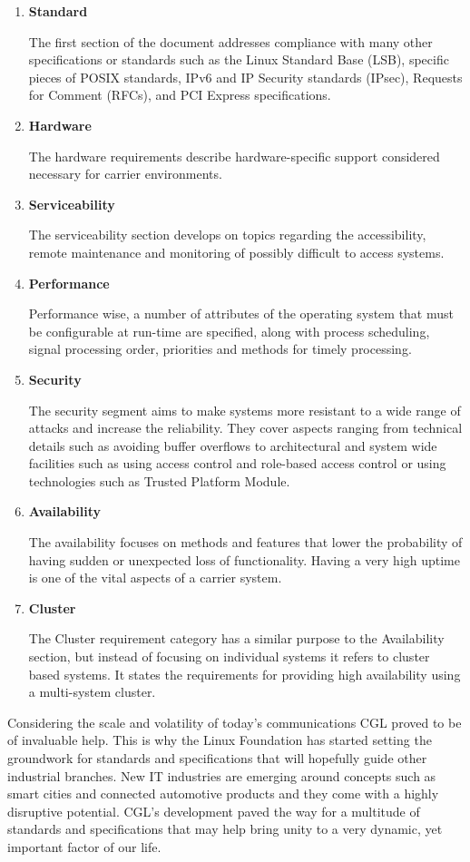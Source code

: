 \begin{enumerate}
\item \textbf{Standard}

The first section of the document addresses compliance with many other specifications or standards such as the Linux Standard Base (LSB), specific pieces of POSIX standards, IPv6 and IP Security standards (IPsec), Requests for Comment (RFCs), and PCI Express specifications.
\item \textbf{Hardware}

The hardware requirements describe hardware-specific support considered necessary for carrier environments.
\item \textbf{Serviceability}

The serviceability section develops on topics regarding the accessibility, remote maintenance and monitoring of possibly difficult to access systems. 
\item \textbf{Performance}

Performance wise, a number of attributes of the operating system that must be configurable at run-time are specified, along with process scheduling, signal processing order, priorities and methods for timely processing.
\item \textbf{Security}

The security segment aims to make systems more resistant to a wide range of attacks and increase the reliability. They cover aspects ranging from technical details such as avoiding buffer overflows to architectural and system wide facilities such as using access control and role-based access control or using technologies such as Trusted Platform Module.
\item \textbf{Availability}

The availability focuses on methods and features that lower the probability of having sudden or unexpected loss of functionality. Having a very high uptime is one of the vital aspects of a carrier system.
\item \textbf{Cluster}

The Cluster requirement category has a similar purpose to the Availability section, but instead of focusing on individual systems it refers to cluster based systems. It states the requirements for providing high availability using a multi-system cluster.

\end{enumerate}

Considering the scale and volatility of today's communications CGL proved to be of invaluable help. This is why the Linux Foundation has started setting the groundwork for standards and specifications that will hopefully guide other industrial branches. New IT industries are emerging around concepts such as smart cities and connected automotive products and they come with a highly disruptive potential. CGL's development paved the way for a multitude of standards and specifications that may help bring unity to a very dynamic, yet important factor of our life.

